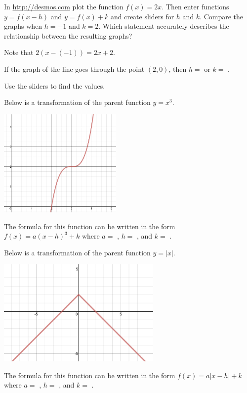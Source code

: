 \documentclass{ximera}
\begin{document}
\begin{question}
In \url{http://desmos.com} plot the function $f(x)=2x$. Then enter functions $y=f(x-h)$ and $y=f(x)+k$ and create sliders for $h$ and $k$. Compare the graphs when $h=-1$ and $k=2$. Which statement accurately describes the relationship between the resulting graphs?
  \begin{solution}
    \begin{multiple-choice}
    \end{multiple-choice}
    \begin{hint}
    Note that $2(x-(-1))=2x+2$.
    \end{hint}
If the graph of the line goes through the point $(2,0)$, then $h=$  or $k=$ .  
	\begin{hint}
    Use the sliders to find the values. 
    \end{hint}
  \end{solution}
\end{question}

\begin{question}
Below is a transformation of the parent function $y=x^3$. 
\begin{image}
\includegraphics[width=6cm]{2_x-3_cubed+2.png}
\end{image}
The formula for this function can be written in the form $f(x)=a(x-h)^3+k$ where $a=$ , $h=$ , and $k=$ .
\end{question}

\begin{question}
Below is a transformation of the parent function $y=|x|$. 
\begin{image}
\includegraphics[width=8cm]{neg_x_+2.png}
\end{image}
The formula for this function can be written in the form $f(x)=a|x-h|+k$ where $a=$ , $h=$ , and $k=$ .
\end{question}
\end{document}

